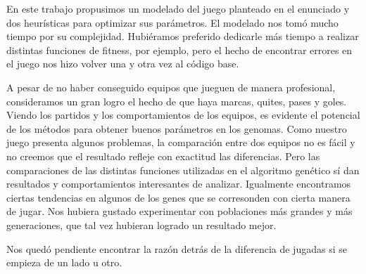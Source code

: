 En este trabajo propusimos un modelado del juego planteado en el enunciado y dos heurísticas para optimizar sus parámetros.
El modelado nos tomó mucho tiempo por su complejidad.
Hubiéramos preferido dedicarle más tiempo a realizar distintas funciones de fitness, por ejemplo, pero el hecho de encontrar errores en el juego nos hizo volver una y otra vez al código base.

A pesar de no haber conseguido equipos que jueguen de manera profesional, consideramos un gran logro el hecho de que haya marcas, quites, pases y goles.
Viendo los partidos y los comportamientos de los equipos, es evidente el potencial de los métodos para obtener buenos parámetros en los genomas.
Como nuestro juego presenta algunos problemas, la comparación entre dos equipos no es fácil y no creemos que el resultado refleje con exactitud las diferencias. Pero las comparaciones de las distintas funciones utilizadas en el algoritmo genético sí dan resultados y comportamientos interesantes de analizar.
Igualmente encontramos ciertas tendencias en algunos de los genes que se corresonden con cierta manera de jugar.
Nos hubiera gustado experimentar con poblaciones más grandes y más generaciones, que tal vez hubieran logrado un resultado mejor.

Nos quedó pendiente encontrar la razón detrás de la diferencia de jugadas si se empieza de un lado u otro.




















